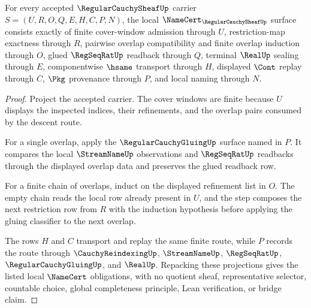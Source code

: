 \begin{theorem}
\label{thm:regular-cauchy-sheaf-namecert-obligations}
For every accepted $\RegularCauchySheafUp$ carrier $S=(U,R,O,Q,E,H,C,P,N)$, the local $\NameCert_{\RegularCauchySheafUp}$ surface consists exactly of finite cover-window admission through $U$, restriction-map exactness through $R$, pairwise overlap compatibility and finite overlap induction through $O$, glued $\RegSeqRatUp$ readback through $Q$, terminal $\RealUp$ sealing through $E$, componentwise $\hsame$ transport through $H$, displayed $\Cont$ replay through $C$, $\Pkg$ provenance through $P$, and local naming through $N$.
\end{theorem}
\begin{proof}
Project the accepted carrier. The cover windows are finite because $U$ displays the inspected indices, their refinements, and the overlap pairs consumed by the descent route.

For a single overlap, apply the $\RegularCauchyGluingUp$ surface named in $P$. It compares the local $\StreamNameUp$ observations and $\RegSeqRatUp$ readbacks through the displayed overlap data and preserves the glued readback row.

For a finite chain of overlaps, induct on the displayed refinement list in $O$. The empty chain reads the local row already present in $U$, and the step composes the next restriction row from $R$ with the induction hypothesis before applying the gluing classifier to the next overlap.

The rows $H$ and $C$ transport and replay the same finite route, while $P$ records the route through $\CauchyReindexingUp$, $\StreamNameUp$, $\RegSeqRatUp$, $\RegularCauchyGluingUp$, and $\RealUp$. Repacking these projections gives the listed local $\NameCert$ obligations, with no quotient sheaf, representative selector, countable choice, global completeness principle, Lean verification, or bridge claim.
\end{proof}


